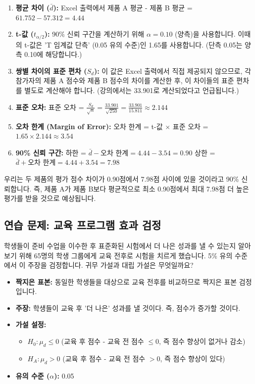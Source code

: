 \documentclass[11pt,a4paper]{article}
\theoremstyle{definition}
\begin{document}
\begin{enumerate}
    \item \textbf{평균 차이 ($\bar{d}$):}
    Excel 출력에서 제품 A 평균 - 제품 B 평균 = $61.752 - 57.312 = 4.44$
    \item \textbf{t-값 ($t_{\alpha/2}$):}
    90\% 신뢰 구간을 계산하기 위해 $\alpha = 0.10$ (양측)을 사용합니다. 이때의 t-값은 'T 임계값 단측' (0.05 유의 수준)인 1.65를 사용합니다. (단측 0.05는 양측 0.10에 해당합니다.)
    \item \textbf{쌍별 차이의 표준 편차 ($S_d$):}
    이 값은 Excel 출력에서 직접 제공되지 않으므로, 각 참가자의 제품 A 점수와 제품 B 점수의 차이를 계산한 후, 이 차이들의 표준 편차를 별도로 계산해야 합니다. (강의에서는 33.901로 계산되었다고 언급됩니다.)
    \item \textbf{표준 오차:}
    표준 오차 = $\frac{S_d}{\sqrt{n}} = \frac{33.901}{\sqrt{250}} = \frac{33.901}{15.811} \approx 2.144$
    \item \textbf{오차 한계 (Margin of Error):}
    오차 한계 = t-값 $\times$ 표준 오차 = $1.65 \times 2.144 \approx 3.54$
    \item \textbf{90\% 신뢰 구간:}
    하한 = $\bar{d} - \text{오차 한계} = 4.44 - 3.54 = 0.90$
    상한 = $\bar{d} + \text{오차 한계} = 4.44 + 3.54 = 7.98$
\end{enumerate}

\begin{summarybox}[title=90\% 신뢰 구간 해석]
우리는 두 제품의 평가 점수 차이가 0.90점에서 7.98점 사이에 있을 것이라고 90\% 신뢰합니다. 즉, 제품 A가 제품 B보다 평균적으로 최소 0.90점에서 최대 7.98점 더 높은 평가를 받을 것으로 예상됩니다.
\end{summarybox}

\subsection{연습 문제: 교육 프로그램 효과 검정}
\begin{examplebox}[title=시나리오:]
학생들이 준비 수업을 이수한 후 표준화된 시험에서 더 나은 성과를 낼 수 있는지 알아보기 위해 65명의 학생 그룹에게 교육 전후로 시험을 치르게 했습니다. 5\% 유의 수준에서 이 주장을 검정합니다. 귀무 가설과 대립 가설은 무엇일까요?
\end{examplebox}

\begin{itemize}
    \item \textbf{짝지은 표본:} 동일한 학생들을 대상으로 교육 전후를 비교하므로 짝지은 표본 검정입니다.
    \item \textbf{주장:} 학생들이 교육 후 '더 나은' 성과를 낼 것이다. 즉, 점수가 증가할 것이다.
    \item \textbf{가설 설정:}
    \begin{itemize}
        \item $H_0: \mu_d \le 0$ (교육 후 점수 - 교육 전 점수 $\le 0$, 즉 점수 향상이 없거나 감소)
        \item $H_A: \mu_d > 0$ (교육 후 점수 - 교육 전 점수 $> 0$, 즉 점수 향상이 있다)
    \end{itemize}
    \item \textbf{유의 수준 ($\alpha$):} 0.05
\end{itemize}
\end{document}
